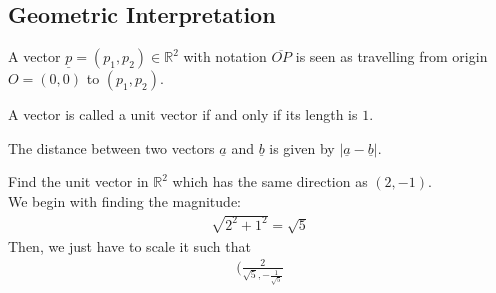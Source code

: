 \documentclass[a4paper]{article}
\theoremstyle{plain}
\theoremstyle{definition}
\newtheorem{defn}{Definition}[section]
\newtheorem{exmp}{Example}[section]
\theoremstyle{remark}
\begin{document}
\subsection{Geometric Interpretation}
A vector $\underline{p} = (p_1,p_2) \in \mathbb{R}^2$ with notation $\overline{OP}$ is seen as travelling from origin $O = (0,0)$ to $(p_1,p_2)$.
\begin{tcolorbox}[colback=black!3!white,colframe=black!60!white,title=\begin{defn}Unit Vector \label{Unit Vector}\end{defn}]
A vector is called a unit vector if and only if its length is $1$.
\end{tcolorbox}
The distance between two vectors $\underline{ a}$ and $\underline{b}$ is given by $| \underline{a} - \underline{b}|$.
\begin{tcolorbox}[colback=black!3!white,colframe=black!60!white,title=\begin{exmp}Example 1 \label{Example 1}\end{exmp}]
        Find the unit vector in $\mathbb{R}^2$ which has the same direction as $(2,-1)$.\\
	We begin with finding the magnitude:
                \begin{align}
                \sqrt{2^2 + 1 ^2} = \sqrt{5} 
                \end{align} Then, we just have to scale it such that
		\begin{align*}
			(\frac{2}{\sqrt{5} , -\frac{1}{\sqrt{5} }}
		\end{align*}
\end{tcolorbox}
\end{document}
